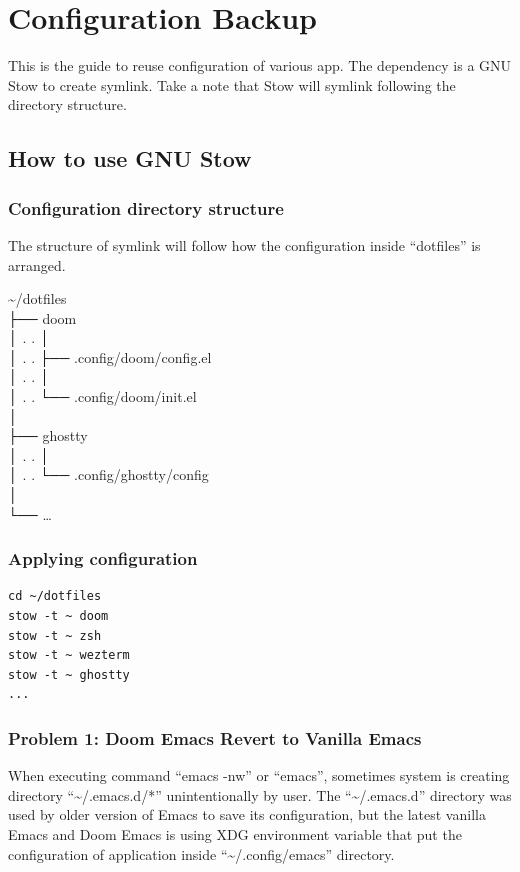 \documentclass[11pt]{article}
\author{Aji Widhi}
\date{\today}
\title{}
\begin{document}
\tableofcontents

\section{Configuration Backup}
\label{sec:orgd3f7a21}
This is the guide to reuse configuration of various app.
The dependency is a GNU Stow to create symlink. Take a note that Stow will symlink following the directory structure.
\subsection{How to use GNU Stow}
\label{sec:orgfa3abf5}

\subsubsection{Configuration directory structure}
\label{sec:org08fae7a}
The structure of symlink will follow how the configuration inside ``dotfiles'' is arranged.

\textasciitilde{}/dotfiles \\
├── doom \\
│ . . │ \\
│ . . ├── .config/doom/config.el \\
│ . . │ \\
│ . . └── .config/doom/init.el \\
│ \\
├── ghostty \\
│ . . │ \\
│ . . └── .config/ghostty/config \\
│ \\
└── \ldots{} \\
\subsubsection{Applying configuration}
\label{sec:orgb8c0349}
\begin{verbatim}
cd ~/dotfiles
stow -t ~ doom
stow -t ~ zsh
stow -t ~ wezterm
stow -t ~ ghostty
...
\end{verbatim}
\subsubsection{Problem 1: Doom Emacs Revert to Vanilla Emacs}
\label{sec:orgf07a9d9}
When executing command ``emacs -nw'' or ``emacs'', sometimes system is creating directory ``\textasciitilde{}/.emacs.d/*'' unintentionally by user.
The ``\textasciitilde{}/.emacs.d'' directory was used by older version of Emacs to save its configuration, but the latest vanilla Emacs and Doom Emacs is using XDG environment variable that put the configuration of application inside ``\textasciitilde{}/.config/emacs'' directory.
\end{document}
